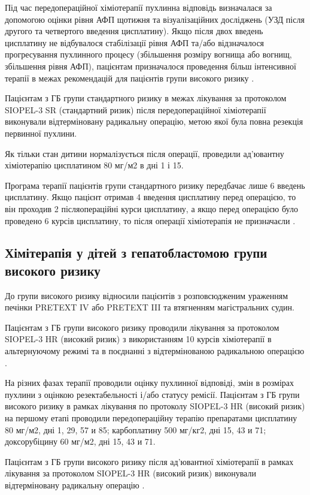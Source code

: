 Під час передопераційної хіміотерапії пухлинна відповідь визначалася за допомогою оцінки рівня АФП щотижня та візуалізаційних досліджень (УЗД після другого та четвертого введення цисплатину). Якщо після двох введень цисплатину не відбувалося стабілізації рівня АФП та/або відзначалося прогресування пухлинного процесу (збільшення розміру вогнища або вогнищ, збільшення рівня АФП), пацієнтам призначалося проведення більш інтенсивної терапії в межах рекомендацій для пацієнтів групи високого ризику \cite{pmid9494762}.

Пацієнтам з ГБ групи стандартного ризику в межах лікування за протоколом SIOPEL-3 SR (стандартний ризик) після передопераційної хіміотерапії виконували відтерміновану радикальну операцію, метою якої була повна резекція первинної пухлини. 

Як тільки стан дитини нормалізується після операції, проведили ад'ювантну хіміотерапію цисплатином 80 мг/м2 в дні 1 і 15.

Програма терапії пацієнтів групи стандартного ризику передбачає лише 6 введень цисплатину. Якщо пацієнт отримав 4 введення цисплатину перед операцією, то він проходив 2 післяопераційні курси цисплатину, а якщо перед операцією було проведено 6 курсів цисплатину, то після операції хіміотерапія не призначаєли \cite{pmid32843604}.

\subsection{Хімітерапія у дітей з гепатобластомою групи високого ризику}
До групи високого ризику відносили пацієнтів з розповсюдженим ураженням печінки PRETEXT IV або PRETEXT III та втягненням магістральних судин.

Пацієнтам з ГБ групи високого ризику проводили лікування за протоколом SIOPEL-3 HR (високий ризик) з використанням 10 курсів хіміотерапії в альтернуючому режимі та в поєднанні з відтермінованою радикальною операцією \cite{pmid28921939}.

На різних фазах терапії проводили оцінку пухлинної відповіді, змін в розмірах пухлини з оцінкою резектабельності і/або статусу ремісії. 
Пацієнтам з ГБ групи високого ризику в рамках лікування по протоколу SIOPEL-3 HR (високий ризик) на першому етапі проводили передопераційну терапію препаратами цисплатину 80 мг/м2, дні 1, 29, 57 и 85; карбоплатину 500 мг/кг2, дні 15, 43 и 71; доксорубіцину 60 мг/м2, дні 15, 43 и 71.

Пацієнтам з ГБ групи високого ризику після ад'ювантної хіміотерапії в рамках лікування за протоколом SIOPEL-3 HR (високий ризик) виконували відтерміновану радикальну операцію \cite{pmid11819207}.

